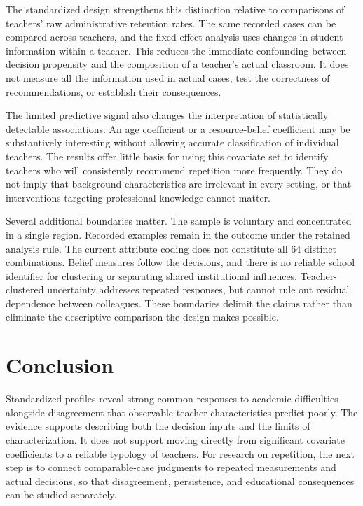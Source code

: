 The standardized design strengthens this distinction relative to comparisons of teachers' raw administrative retention rates. The same recorded cases can be compared across teachers, and the fixed-effect analysis uses changes in student information within a teacher. This reduces the immediate confounding between decision propensity and the composition of a teacher's actual classroom. It does not measure all the information used in actual cases, test the correctness of recommendations, or establish their consequences.

The limited predictive signal also changes the interpretation of statistically detectable associations. An age coefficient or a resource-belief coefficient may be substantively interesting without allowing accurate classification of individual teachers. The results offer little basis for using this covariate set to identify teachers who will consistently recommend repetition more frequently. They do not imply that background characteristics are irrelevant in every setting, or that interventions targeting professional knowledge cannot matter.


Several additional boundaries matter. The sample is voluntary and concentrated in a single region. Recorded examples remain in the outcome under the retained analysis rule. The current attribute coding does not constitute all 64 distinct combinations. Belief measures follow the decisions, and there is no reliable school identifier for clustering or separating shared institutional influences. Teacher-clustered uncertainty addresses repeated responses, but cannot rule out residual dependence between colleagues. These boundaries delimit the claims rather than eliminate the descriptive comparison the design makes possible.

\section{Conclusion}
Standardized profiles reveal strong common responses to academic difficulties alongside disagreement that observable teacher characteristics predict poorly. The evidence supports describing both the decision inputs and the limits of characterization. It does not support moving directly from significant covariate coefficients to a reliable typology of teachers. For research on repetition, the next step is to connect comparable-case judgments to repeated measurements and actual decisions, so that disagreement, persistence, and educational consequences can be studied separately.

